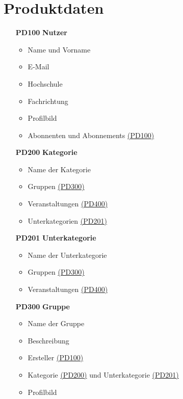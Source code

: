 \documentclass[parskip=full]{scrartcl}
\begin{document}
		\section{Produktdaten}
		\begin{itemize}
			\item[\textbf{PD100}] \textbf{Nutzer} \label{sec:PD100}
			\begin{itemize}[nosep]
				\item Name und Vorname
				\item E-Mail
				\item Hochschule
				\item Fachrichtung
				\item Profilbild
				\item \gls{Abonnenten} und \gls{Abonnements} \hyperref[sec:PD100]{(PD100)}
			\end{itemize}
			\item[\textbf{PD200}] \textbf{\gls{Kategorie}} \label{sec:PD200}
			\begin{itemize}[nosep]
				\item Name der \gls{Kategorie}
				\item Gruppen \hyperref[sec:PD300]{(PD300)}
				\item Veranstaltungen \hyperref[sec:PD400]{(PD400)}
				\item \gls{Unterkategorie}n \hyperref[sec:PD201]{(PD201)}
			\end{itemize}
			\item[\textbf{PD201}] \textbf{\gls{Unterkategorie}} \label{sec:PD201}
			\begin{itemize}[nosep]
				\item Name der \gls{Unterkategorie}
				\item Gruppen \hyperref[sec:PD300]{(PD300)}
				\item Veranstaltungen \hyperref[sec:PD400]{(PD400)}
			\end{itemize}
			\item[\textbf{PD300}] \textbf{Gruppe} \label{sec:PD300}
			\begin{itemize}
				\item Name der Gruppe
				\item Beschreibung
				\item Ersteller \hyperref[sec:PD100]{(PD100)}
				\item \gls{Kategorie} \hyperref[sec:PD200]{(PD200)} und \gls{Unterkategorie} \hyperref[sec:PD201]{(PD201)}
				\item Profilbild
			\end{itemize}

\end{itemize}
\end{document}
